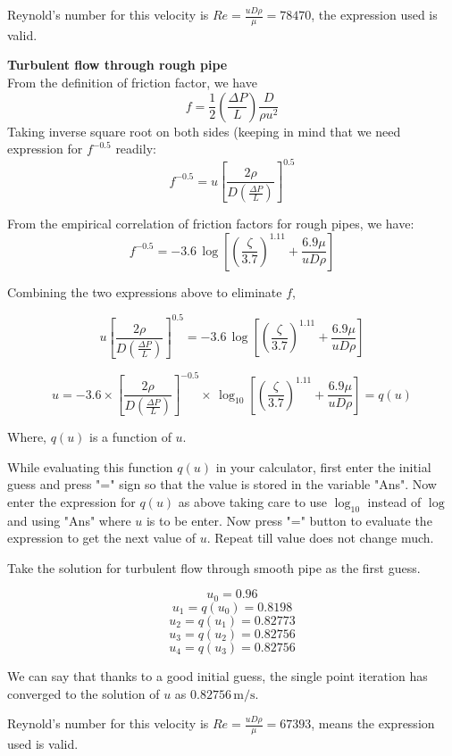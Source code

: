 \begin{solution}[print]
Reynold's number for this velocity is $ Re = \frac{u D \rho}{\mu} = 78470$, the expression used is valid.


{\bf Turbulent flow through rough pipe}\\

From the definition of friction factor, we have
$$ f = \frac{1}{2} \left( \frac{\Delta P}{L} \right) \frac{D}{\rho u^2}$$
Taking inverse square root on both sides (keeping in mind that we need expression for $f^{-0.5}$ readily:
$$ f^{-0.5} = u \left[\frac{2 \rho}{D \left(\frac{\Delta P}{L}\right)} \right]^{0.5}$$

From the empirical correlation of friction factors for rough pipes, we have:
$$ f^{-0.5} = -3.6 \, \log \left[ \left(\frac{\zeta}{3.7}\right)^{1.11} + \frac{6.9 \mu }{u D \rho} \right] $$

Combining the two expressions above to eliminate $f$,

$$ u \left[\frac{2 \rho}{D \left(\frac{\Delta P}{L}\right)} \right]^{0.5} = -3.6 \, \log \left[ \left(\frac{\zeta}{3.7}\right)^{1.11} + \frac{6.9 \mu }{u D \rho} \right] $$


$$ u = -3.6 \times \left[\frac{2 \rho}{D \left(\frac{\Delta P}{L}\right)} \right]^{-0.5} \times \, \log_{10} \left[ \left(\frac{\zeta}{3.7}\right)^{1.11} + \frac{6.9 \mu }{u D \rho} \right] = q(u) $$

Where, $q(u)$ is a function of $u$.

While evaluating this function $q(u)$ in your calculator, first enter the initial guess and press "=" sign so that the value is stored in the variable "Ans". Now enter the expression for $q(u)$ as above taking care to use $\log_{10}$ instead of $\log$ and using "Ans" where $u$ is to be enter. Now press "=" button to evaluate the expression to get the next value of $u$. Repeat till value does not change much.

Take the solution for turbulent flow through smooth pipe as the first guess.

$$ u_0 = 0.96 $$
$$ u_1 = q(u_0) = 0.8198$$
$$ u_2 = q(u_1) = 0.82773$$
$$ u_3 = q(u_2) = 0.82756$$
$$ u_4 = q(u_3) = 0.82756$$

We can say that thanks to a good initial guess, the single point iteration has converged to the solution of $u$ as $0.82756 \, \text{m/s}$.

Reynold's number for this velocity is $ Re = \frac{u D \rho}{\mu} = 67393$, means the expression used is valid.

\end{solution}

